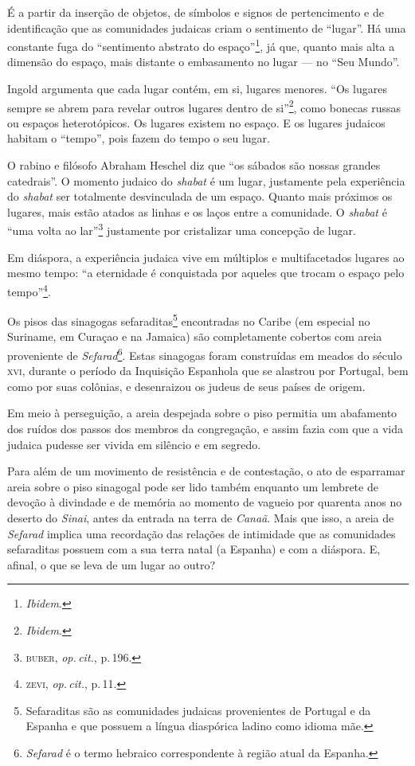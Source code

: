 É a partir da inserção de objetos, de símbolos e signos de pertencimento
e de identificação que as comunidades judaicas criam o sentimento de
``lugar''. Há uma constante fuga do ``sentimento abstrato do
espaço''\footnote{\emph{Ibidem}.}, já que, quanto mais alta a dimensão do
espaço, mais distante o embasamento no lugar --- no ``Seu Mundo''.

Ingold argumenta que cada lugar contém, em si, lugares menores.
``Os lugares sempre se abrem para revelar outros lugares dentro de
si''\footnote{\emph{Ibidem}.}, como bonecas russas ou espaços heterotópicos.
Os lugares existem no espaço. E os lugares judaicos habitam o ``tempo'',
pois fazem do tempo o seu lugar.

O rabino e filósofo Abraham Heschel diz que ``os sábados são
nossas grandes catedrais''. O momento judaico do \emph{shabat} é um
lugar, justamente pela experiência do \emph{shabat} ser totalmente
desvinculada de um espaço. Quanto mais próximos os lugares, mais estão
atados as linhas e os laços entre a comunidade. O \emph{shabat} é
``uma volta ao lar''\footnote{\textsc{buber}, \emph{op.\,cit.}, p.\,196.}
justamente por cristalizar uma concepção de lugar.

Em diáspora, a experiência judaica vive em múltiplos e multifacetados
lugares ao mesmo tempo: ``a eternidade é conquistada por aqueles
que trocam o espaço pelo tempo''\footnote{\textsc{zevi}, \emph{op.\,cit.}, p.\,11.}.

\begin{center}\end{center}

\noindent{}Os pisos das sinagogas sefaraditas\footnote{Sefaraditas
  são as comunidades judaicas provenientes de Portugal e da Espanha e
  que possuem a língua diaspórica ladino como idioma mãe.}
encontradas no Caribe (em especial no Suriname, em Curaçao e na Jamaica)
são completamente cobertos com areia proveniente de
\emph{Sefarad}\footnote{\emph{Sefarad} é o termo hebraico correspondente
  à região atual da Espanha.}. Estas sinagogas foram construídas em
meados do século \textsc{xvi}, durante o período da Inquisição Espanhola que se
alastrou por Portugal, bem como por suas colônias, e desenraizou os
judeus de seus países de origem.

Em meio à perseguição, a areia despejada sobre o piso permitia um
abafamento dos ruídos dos passos dos membros da congregação, e assim
fazia com que a vida judaica pudesse ser vivida em silêncio e em
segredo.

Para além de um movimento de resistência e de contestação, o ato de
esparramar areia sobre o piso sinagogal pode ser lido também enquanto um
lembrete de devoção à divindade e de memória ao momento de vagueio por
quarenta anos no deserto do \emph{Sinai}, antes da entrada na terra de
\emph{Canaã}. Mais que isso, a areia de \emph{Sefarad} implica uma
recordação das relações de intimidade que as comunidades
sefaraditas possuem com a sua terra natal (a Espanha) e com a
diáspora. E, afinal, o que se leva de um lugar ao outro?

